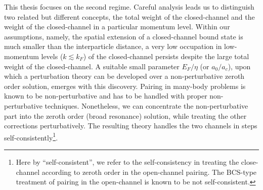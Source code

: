 This thesis focuses on the second regime.  Careful analysis leads us to distinguish two related but different concepts, the total weight of the closed-channel  and the weight of the closed-channel in a particular momentum level.  
       Within our assumptions, namely, the spatial extension of a closed-channel bound state is much smaller than the interparticle distance, a very low occupation in low-momentum levels ($k\lesssim{}k_{F}$) of the closed-channel persists despite the large total weight of the closed-channel.     A suitable small parameter $E_F/\eta$ (or $a_0/a_c$), upon which a perturbation theory can be developed over a non-perturbative zeroth order solution, emerges with this discovery.  Pairing in many-body problems is known to be  non-perturbative and has to be handled with proper non-perturbative techniques.  Nonetheless, we can concentrate the non-perturbative part into the zeroth order  (broad resonance) solution, while treating the other corrections perturbatively.   The resulting theory  handles the two channels in steps self-consistently\footnote{Here by ``self-consistent'', we refer to the self-consistency in treating the close-channel according to zeroth order in the open-channel pairing.  The BCS-type treatment of pairing in the open-channel   is known to be not self-consistent. }. 
       
